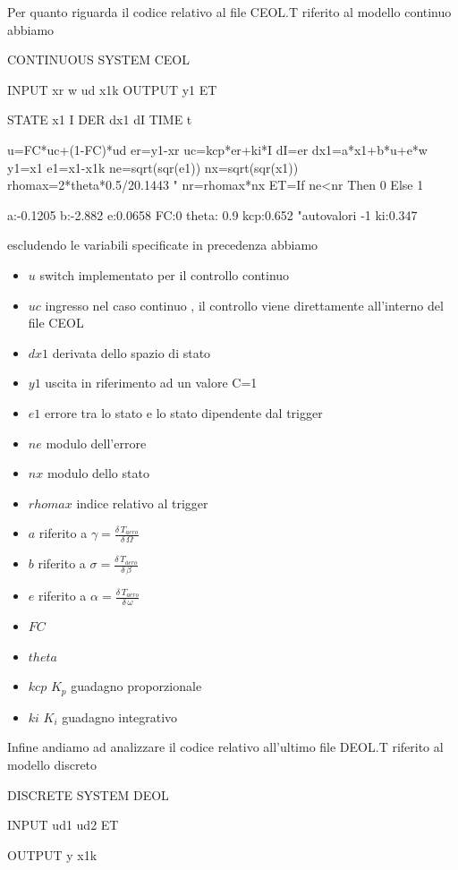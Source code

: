 \documentclass[a4paper,13pt]{article}
\begin{document}
Per quanto riguarda il codice relativo al file CEOL.T riferito al modello continuo abbiamo

CONTINUOUS SYSTEM CEOL


INPUT xr w ud x1k 
OUTPUT y1 ET

STATE x1 I 
DER dx1 dI
TIME t

u=FC*uc+(1-FC)*ud 
er=y1-xr
uc=kcp*er+ki*I 
dI=er
dx1=a*x1+b*u+e*w 
y1=x1 
e1=x1-x1k 
ne=sqrt(sqr(e1)) 
nx=sqrt(sqr(x1)) 
rhomax=2*theta*0.5/20.1443 "
nr=rhomax*nx
ET=If ne<nr Then 0 Else 1

a:-0.1205
b:-2.882
e:0.0658
FC:0
theta: 0.9
kcp:0.652 "autovalori -1
ki:0.347

escludendo le variabili specificate in precedenza abbiamo
\begin{itemize}
\item $u$      switch implementato per il controllo continuo
\item $uc$     ingresso nel caso continuo , il controllo viene direttamente all'interno del file CEOL
\item $dx1$    derivata dello spazio di stato
\item $y1$     uscita in riferimento ad un valore C=1
\item $e1$     errore tra lo stato e lo stato dipendente dal trigger
\item $ne$     modulo dell'errore
\item $nx$     modulo dello stato
\item $rhomax$ indice relativo al trigger

\item $a$      riferito a $\gamma=\frac{\delta \, T_{aero}}{\delta \, \Omega}$
\item $b$      riferito a $\sigma=\frac{\delta \, T_{aero}}{\delta \, \beta}$
\item $e$      riferito a $\alpha=\frac{\delta \, T_{aero}}{\delta \, \omega}$
\item $FC$
\item $theta$
\item $kcp$    $K_{p}$ guadagno proporzionale
\item $ki$     $K_{i}$ guadagno integrativo
\end{itemize}

Infine andiamo ad analizzare il codice relativo all'ultimo file DEOL.T riferito al modello discreto

DISCRETE SYSTEM DEOL

INPUT ud1 ud2 ET

OUTPUT y x1k
\end{document}
